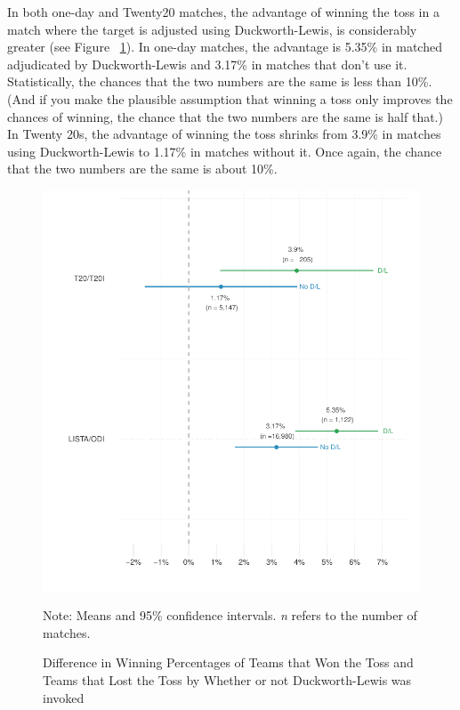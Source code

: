 \documentclass[12pt]{article}
\begin{document}
In both one-day and Twenty20 matches, the advantage of winning the toss in a match where the target is adjusted using Duckworth-Lewis, is considerably greater (see Figure ~\ref{fig:dl}). In one-day matches, the advantage is 5.35\% in matched adjudicated by Duckworth-Lewis and 3.17\% in matches that don't use it. Statistically, the chances that the two numbers are the same is less than 10\%. (And if you make the plausible assumption that winning a toss only improves the chances of winning, the chance that the two numbers are the same is half that.) In Twenty 20s, the advantage of winning the toss shrinks from 3.9\% in matches using Duckworth-Lewis to 1.17\% in matches without it. Once again, the chance that the two numbers are the same is about 10\%. 

\begin{figure}[htbp]
\centering
\caption{Difference in Winning Percentages of Teams that Won the Toss and Teams that Lost the Toss by Whether or not Duckworth-Lewis was invoked}
\includegraphics[scale=.85]{../figs/winbyDL.pdf}
{\footnotesize Note: Means and 95\% confidence intervals. \emph{n} refers to the number of matches.\par}
\label{fig:dl}
\end{figure}
\end{document}
